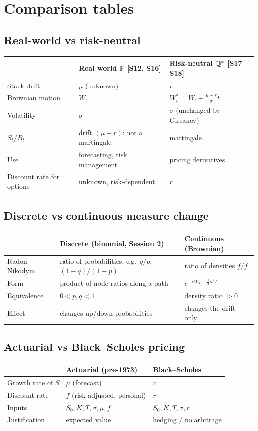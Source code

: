 \documentclass[10pt]{article}
\begin{document}
\section{Comparison tables}
\subsection{Real-world vs risk-neutral}
{\small\begin{tabularx}{\linewidth}{@{}l X X@{}}\toprule
 & Real world $\mathbb{P}$ [S12, S16] & Risk-neutral $\mathbb{Q}^*$ [S17--S18]\\\midrule
Stock drift & $\mu$ (unknown) & $r$\\
Brownian motion & $W_t$ & $W^*_t=W_t+\frac{\mu-r}{\sigma}t$\\
Volatility & $\sigma$ & $\sigma$ (unchanged by Girsanov)\\
$S_t/B_t$ & drift $(\mu-r)$: not a martingale & martingale\\
Use & forecasting, risk management & pricing derivatives\\
Discount rate for options & unknown, risk-dependent & $r$\\\bottomrule
\end{tabularx}}
\subsection{Discrete vs continuous measure change}
{\small\begin{tabularx}{\linewidth}{@{}l X X@{}}\toprule
 & Discrete (binomial, Session 2) & Continuous (Brownian)\\\midrule
Radon--Nikodym & ratio of probabilities, e.g.\ $q/p$, $(1-q)/(1-p)$ & ratio of densities $f/\tilde f$\\
Form & product of node ratios along a path & $e^{-\kappa W_T-\frac12\kappa^2T}$\\
Equivalence & $0<p,q<1$ & density ratio $>0$\\
Effect & changes up/down probabilities & changes the drift only\\\bottomrule
\end{tabularx}}
\subsection{Actuarial vs Black--Scholes pricing}
{\small\begin{tabularx}{\linewidth}{@{}l X X@{}}\toprule
 & Actuarial (pre-1973) & Black--Scholes\\\midrule
Growth rate of $S$ & $\mu$ (forecast) & $r$\\
Discount rate & $f$ (risk-adjusted, personal) & $r$\\
Inputs & $S_0,K,T,\sigma,\mu,f$ & $S_0,K,T,\sigma,r$\\
Justification & expected value & hedging / no arbitrage\\\bottomrule
\end{tabularx}}
\end{document}
